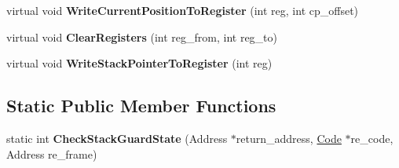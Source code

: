 \begin{DoxyCompactItemize}
\item 
virtual void {\bfseries Write\+Current\+Position\+To\+Register} (int reg, int cp\+\_\+offset)\hypertarget{classv8_1_1internal_1_1_reg_exp_macro_assembler_i_a32_abbc5bf6f018f59a42e35d9dc043d43d3}{}\label{classv8_1_1internal_1_1_reg_exp_macro_assembler_i_a32_abbc5bf6f018f59a42e35d9dc043d43d3}

\item 
virtual void {\bfseries Clear\+Registers} (int reg\+\_\+from, int reg\+\_\+to)\hypertarget{classv8_1_1internal_1_1_reg_exp_macro_assembler_i_a32_aa166f443e627743bed233f025faf5151}{}\label{classv8_1_1internal_1_1_reg_exp_macro_assembler_i_a32_aa166f443e627743bed233f025faf5151}

\item 
virtual void {\bfseries Write\+Stack\+Pointer\+To\+Register} (int reg)\hypertarget{classv8_1_1internal_1_1_reg_exp_macro_assembler_i_a32_af72711a532acfce762ca951f20013a8a}{}\label{classv8_1_1internal_1_1_reg_exp_macro_assembler_i_a32_af72711a532acfce762ca951f20013a8a}

\end{DoxyCompactItemize}
\subsection*{Static Public Member Functions}
\begin{DoxyCompactItemize}
\item 
static int {\bfseries Check\+Stack\+Guard\+State} (Address $\ast$return\+\_\+address, \hyperlink{classv8_1_1internal_1_1_code}{Code} $\ast$re\+\_\+code, Address re\+\_\+frame)\hypertarget{classv8_1_1internal_1_1_reg_exp_macro_assembler_i_a32_ae585a8b483dd21034a5ebace5a55dbbf}{}\label{classv8_1_1internal_1_1_reg_exp_macro_assembler_i_a32_ae585a8b483dd21034a5ebace5a55dbbf}

\end{DoxyCompactItemize}

